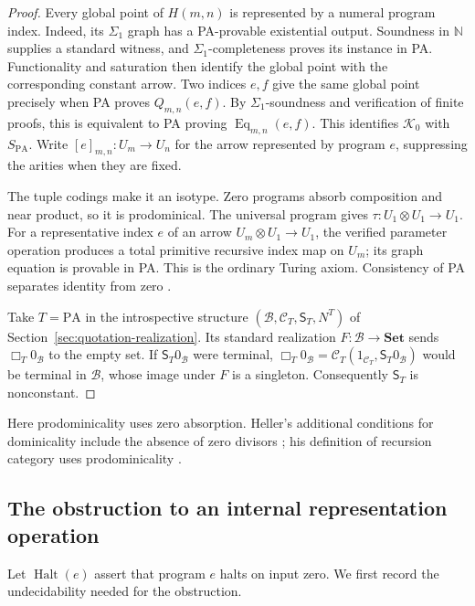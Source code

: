 \documentclass[11pt]{article}
\theoremstyle{definition}
\theoremstyle{remark}
\begin{document}
\begin{proof}
Every global point of $H(m,n)$ is represented by a numeral
program index. Indeed, its $\Sigma_1$ graph has a PA-provable
existential output. Soundness in $\mathbb N$ supplies a standard
witness, and $\Sigma_1$-completeness proves its instance in PA.
Functionality and saturation then identify the global point
with the corresponding constant arrow. Two indices $e,f$ give
the same global point precisely when PA proves $Q_{m,n}(e,f)$.
By $\Sigma_1$-soundness and verification of finite proofs, this
is equivalent to PA proving $\operatorname{Eq}_{m,n}(e,f)$.
This identifies $\mathcal K_0$ with $S_{\mathrm{PA}}$.
Write $[e]_{m,n}:U_m\to U_n$ for the arrow represented by
program $e$, suppressing the arities when they are fixed.

The tuple codings make it an isotype. Zero programs absorb
composition and near product, so it is prodominical. The universal
program gives $\tau:U_1\otimes U_1\to U_1$.
For a representative index $e$ of an arrow
$U_m\otimes U_1\to U_1$, the verified parameter operation
produces a total primitive recursive index map on $U_m$;
its graph equation is provable in PA. This is the ordinary
Turing axiom. Consistency of PA separates identity from zero
\cite[Proposition~7.5]{RecursionCompletions}.

Take $T=\mathrm{PA}$ in the introspective structure
$(\mathcal B,\mathcal C_T,\mathsf S_T,N^T)$ of
Section~\ref{sec:quotation-realization}.
Its standard realization $F:\mathcal B\to\mathbf{Set}$ sends
$\Box_T0_{\mathcal B}$ to the empty set. If $\mathsf S_T0_{\mathcal B}$ were terminal,
$\Box_T0_{\mathcal B}=\mathcal C_T(1_{\mathcal C_T},\mathsf S_T0_{\mathcal B})$ would be terminal in
$\mathcal B$, whose image under $F$ is a singleton.
Consequently $\mathsf S_T$ is nonconstant.
\end{proof}

Here prodominicality uses zero absorption. Heller's additional
conditions for dominicality include the absence of zero divisors
\cite[Proposition~5.1]{Heller}; his definition of recursion
category uses prodominicality \cite[p.~1265]{Heller}.

\subsection{The obstruction to an internal representation operation}

Let $\operatorname{Halt}(e)$ assert that program $e$ halts on
input zero. We first record the undecidability needed for the
obstruction.
\end{document}
